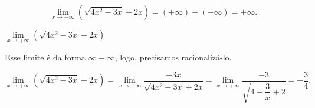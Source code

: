 \cleardoublepage\documentclass[../main.tex]{subfiles}
\begin{document}
\begin{exeresol}
\begin{compactenum}[a)]
\begin{resol}
\[ \lim\limits_{x \to -\infty} (\sqrt{4x^2-3x}-2x)= (+\infty)-(-\infty)=+\infty. \]
  \end{resol}
 \item \(\lim\limits_{x \to +\infty} (\sqrt{4x^2-3x}-2x)\)\\
 \begin{resol}
   Esse limite é da forma \(\infty-\infty\), logo, precisamos racionalizá-lo.

\[ \lim\limits_{x \to +\infty} (\sqrt{4x^2-3x}-2x)= \lim\limits_{x \to +\infty} \dfrac{-3x}{\sqrt{4x^2-3x}+2x}= \lim\limits_{x \to +\infty} \dfrac{-3}{\sqrt{4-\dfrac{3}{x}}+2} = -\dfrac{3}{4}. \]
 \end{resol}
  \end{compactenum}
\end{exeresol}

\end{document}
